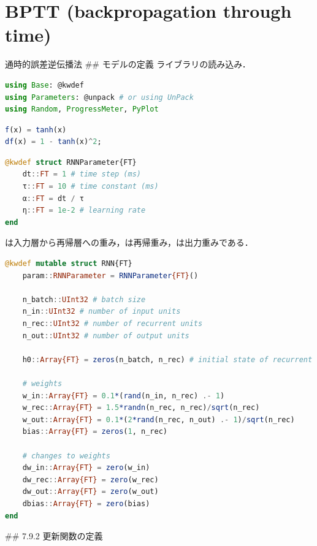 \section{BPTT (backpropagation through time)}
通時的誤差逆伝播法
## モデルの定義
ライブラリの読み込み．
\begin{lstlisting}[language=julia]
using Base: @kwdef
using Parameters: @unpack # or using UnPack
using Random, ProgressMeter, PyPlot
\end{lstlisting}
\begin{lstlisting}[language=julia]
f(x) = tanh(x)
df(x) = 1 - tanh(x)^2;
\end{lstlisting}
\begin{lstlisting}[language=julia]
@kwdef struct RNNParameter{FT}
    dt::FT = 1 # time step (ms)
    τ::FT = 10 # time constant (ms)
    α::FT = dt / τ 
    η::FT = 1e-2 # learning rate
end
\end{lstlisting}
は入力層から再帰層への重み，は再帰重み，は出力重みである．
\begin{lstlisting}[language=julia]
@kwdef mutable struct RNN{FT}
    param::RNNParameter = RNNParameter{FT}()
    
    n_batch::UInt32 # batch size
    n_in::UInt32 # number of input units
    n_rec::UInt32 # number of recurrent units
    n_out::UInt32 # number of output units
    
    h0::Array{FT} = zeros(n_batch, n_rec) # initial state of recurrent units

    # weights
    w_in::Array{FT} = 0.1*(rand(n_in, n_rec) .- 1)
    w_rec::Array{FT} = 1.5*randn(n_rec, n_rec)/sqrt(n_rec)
    w_out::Array{FT} = 0.1*(2*rand(n_rec, n_out) .- 1)/sqrt(n_rec)
    bias::Array{FT} = zeros(1, n_rec)
    
    # changes to weights
    dw_in::Array{FT} = zero(w_in)
    dw_rec::Array{FT} = zero(w_rec)
    dw_out::Array{FT} = zero(w_out)
    dbias::Array{FT} = zero(bias)
end
\end{lstlisting}
## 7.9.2 更新関数の定義
